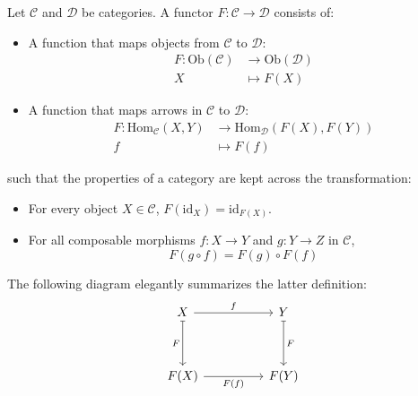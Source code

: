 \begin{definition} Let $\mathcal{C}$ and $\mathcal{D}$ be categories. A functor $F : \mathcal{C} \to \mathcal{D}$ consists of:
  \label{def:functor}
  \begin{itemize}
  \item A function that maps objects from $\mathcal{C}$ to $\mathcal{D}$:
    \[
      \begin{aligned}
        F : \mathrm{Ob}(\mathcal{C}) &\longrightarrow \mathrm{Ob}(\mathcal{D}) \\
        X &\longmapsto F(X)
      \end{aligned}
    \]
  \item A function that maps arrows in $\mathcal{C}$ to $\mathcal{D}$:
    \[
      \begin{aligned}
        F : \mathrm{Hom}_{\mathcal{C}}(X,Y) &\longrightarrow \mathrm{Hom}_{\mathcal{D}}(F(X),F(Y)) \\
        f &\longmapsto F(f)
      \end{aligned}
    \]
  \end{itemize}
  such that the properties of a category are kept across the transformation:
  \begin{itemize}
  \item For every object $X \in \mathcal{C}$, $F(\mathrm{id}_X) = \mathrm{id}_{F(X)}$.
  \item For all composable morphisms $f : X \to Y$ and $g : Y \to Z$ in $\mathcal{C}$,
    \[
      F(g \circ f) = F(g) \circ F(f)
    \]
  \end{itemize}

  The following diagram elegantly summarizes the latter definition:
  \[
    \begin{tikzcd}[row sep=huge, column sep=huge]
      X \arrow[r, "f"] \arrow[d, mapsto, "F"'] & Y \arrow[d, mapsto, "F"] \\
      F(X) \arrow[r, "F(f)"'] & F(Y)
    \end{tikzcd}
  \]
\end{definition}

